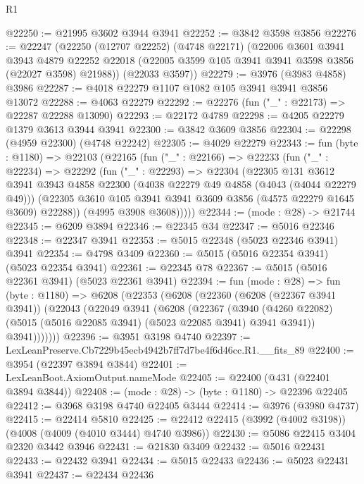 \begin{lexlean}{R1}
\begin{coremodule}
@22250 := @21995 @3602 @3944 @3941
@22252 := @3842 @3598 @3856
@22276 := @22247
    (@22250
      (@12707 @22252)
      (@4748 @22171)
      (@22006
        @3601
        @3941
        @3943
        @4879
        @22252
        @22018
        (@22005 @3599 @105 @3941 @3941 @3598 @3856 (@22027 @3598) @21988))
      (@22033 @3597))
@22279 := @3976 (@3983 @4858) @3986
@22287 := @4018 @22279 @1107 @1082 @105 @3941 @3941 @3856 @13072
@22288 := @4063 @22279
@22292 := @22276 (fun ("_" : @22173) => @22287 @22288 @13090)
@22293 := @22172 @4789
@22298 := @4205 @22279 @1379 @3613 @3944 @3941
@22300 := @3842 @3609 @3856
@22304 := @22298 (@4959 @22300) (@4748 @22242)
@22305 := @4029 @22279
@22343 := fun (byte : @1180) =>
  @22103
    (@22165
      (fun ("_" : @22166) =>
      @22233
        (fun ("_" : @22234) =>
        @22292
          (fun ("_" : @22293) =>
          @22304
            (@22305
              @131
              @3612
              @3941
              @3943
              @4858
              @22300
              (@4038 @22279 @49 @4858 (@4043 (@4044 @22279 @49)))
              (@22305 @3610 @105 @3941 @3941 @3609 @3856 (@4575 @22279 @1645 @3609) @22288))
            (@4995 @3908 @3608)))))
@22344 := (mode : @28) -> @21744
@22345 := @6209 @3894
@22346 := @22345 @34
@22347 := @5016 @22346
@22348 := @22347 @3941
@22353 := @5015 @22348 (@5023 @22346 @3941) @3941
@22354 := @4798 @3409
@22360 := @5015 (@5016 @22354 @3941) (@5023 @22354 @3941)
@22361 := @22345 @78
@22367 := @5015 (@5016 @22361 @3941) (@5023 @22361 @3941)
@22394 := fun (mode : @28) =>
  fun (byte : @1180) =>
  @6208
    (@22353
      (@6208
        (@22360
          (@6208 (@22367 @3941 @3941))
          (@22043
            (@22049
              @3941
              (@6208
                (@22367
                  (@3940
                    (@4260 @22082)
                    (@5015 (@5016 @22085 @3941) (@5023 @22085 @3941) @3941 @3941))
                  @3941)))))))
@22396 := @3951 @3198 @4740
@22397 := LexLeanPreserve.Cb7229b45ecb4942b7ff7d7be4f6d46cc.R1.__fits_89
@22400 := @3954 (@22397 @3894 @3844)
@22401 := LexLeanBoot.AxiomOutput.nameMode
@22405 := @22400 (@431 (@22401 @3894 @3844))
@22408 := (mode : @28) -> (byte : @1180) -> @22396 @22405
@22412 := @3968 @3198 @4740 @22405 @3444
@22414 := @3976 (@3980 @4737)
@22415 := @22414 @5810
@22425 := @22412 @22415 (@3992 (@4002 @3198)) (@4008 (@4009 (@4010 @3444) @4740 @3986))
@22430 := @5086 @22415 @3404 @2320 @3442 @3946
@22431 := @21830 @3409
@22432 := @5016 @22431
@22433 := @22432 @3941
@22434 := @5015 @22433
@22436 := @5023 @22431 @3941
@22437 := @22434 @22436

\end{coremodule}
\end{lexlean}
